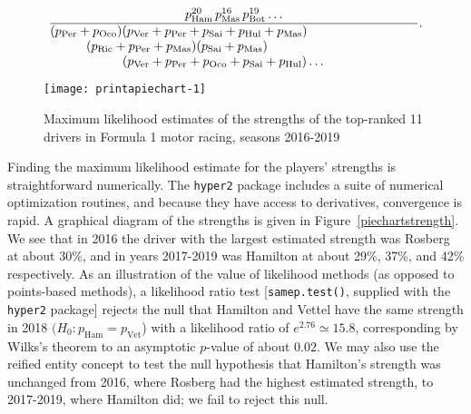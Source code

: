 \documentclass{elsarticle}
\begin{document}
\newcommand{\pham}{p_\mathrm{Ham}}
\newcommand{\pvet}{p_\mathrm{Vet}}
\newcommand{\pbot}{p_\mathrm{Bot}}
\newcommand{\prai}{p_\mathrm{Rai}}
\newcommand{\pric}{p_\mathrm{Ric}}
\newcommand{\pver}{p_\mathrm{Ver}}
\newcommand{\pper}{p_\mathrm{Per}}
\newcommand{\poco}{p_\mathrm{Oco}}
\newcommand{\psai}{p_\mathrm{Sai}}
\newcommand{\phul}{p_\mathrm{H\"{u}l}}
\newcommand{\pmas}{p_\mathrm{Mas}}

\begin{equation}
\frac{p_\mathrm{Ham}^{20}\,p_\mathrm{Mas}^{16}\,p_\mathrm{Bot}^{19}\ldots
}{\parbox{4in}{$(p_\mathrm{Per}+p_\mathrm{Oco})(p_\mathrm{Ver}+p_\mathrm{Per}+p_\mathrm{Sai}+p_\mathrm{Hul}+p_\mathrm{Mas})\\
    \rule{10mm}{0mm}(p_\mathrm{Ric}+p_\mathrm{Per}+p_\mathrm{Mas})(p_\mathrm{Sai}+p_\mathrm{Mas})\\ \rule{20mm}{0mm}
    (p_\mathrm{Ver}+ p_\mathrm{Per}+ p_\mathrm{Oco}+ p_\mathrm{Sai}+ p_\mathrm{Hul})\ldots
     $}}.
 \end{equation}

\begin{figure}
{\centering \texttt{[image: printapiechart-1]}}
\caption[\doublespacing Maximum likelihood estimates \label{piechartstrength} of the
  strengths of the top-ranked 11 drivers in Formula 1 motor racing,
  seasons 2016-2019]{\doublespacing Maximum likelihood
  estimates \label{piechartstrength} of the strengths of the
  top-ranked 11 drivers in Formula 1 motor racing, seasons
  2016-2019}\label{fig:printapiechart}
\end{figure}

Finding the maximum likelihood estimate for the players' strengths is
straightforward numerically. The \texttt{hyper2} package includes a
suite of numerical optimization routines, and because they have access
to derivatives, convergence is rapid.  A graphical diagram of the
strengths is given in Figure~\ref{piechartstrength}.  We see that in
2016 the driver with the largest estimated strength was Rosberg at
about 30\%, and in years 2017-2019 was Hamilton at about 29\%, 37\%,
and 42\% respectively. As an illustration of the value of likelihood
methods (as opposed to points-based methods), a likelihood ratio test
[\texttt{samep.test()}, supplied with the \texttt{hyper2} package]
rejects the null that Hamilton and Vettel have the same strength in
2018 $(H_0\colon p_\mathrm{Ham}= p_\mathrm{Vet}$) with a likelihood
ratio of $e^{2.76}\simeq 15.8$, corresponding by Wilks's theorem to an
asymptotic \(p\)-value of about \(0.02\). We may also use the reified
entity concept to test the null hypothesis that Hamilton's strength
was unchanged from 2016, where Rosberg had the highest estimated
strength, to 2017-2019, where Hamilton did; we fail to reject this
null.
\end{document}
